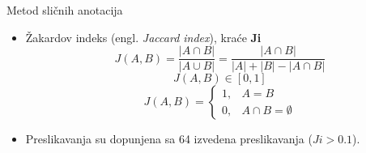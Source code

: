 \documentclass{beamer}
\newcommand{\en}[1]{(engl. \textit{#1})}
\newcommand{\keyword}[1]{\textbf{#1}}
\begin{document}
\begin{frame}{Metod sličnih anotacija}
  \begin{itemize}
    \item Žakardov indeks \en{Jaccard index}, kraće \keyword{Ji}  
$$J(A,B) = \dfrac{|A \cap B|}{|A \cup B|} =  \dfrac{|A \cap B|}{|A|+|B|-|A \cap B|}$$
$$  J(A,B) \in [0, 1] $$
\[   
  J(A,B) = 
    \begin{cases}
      1,&A=B  \\
      0,&A\cap B=\emptyset
    \end{cases}
\]

  \item  Preslikavanja su dopunjena sa 64 izvedena preslikavanja ($Ji>0.1$).

  \end{itemize}
\end{frame}
\end{document}
